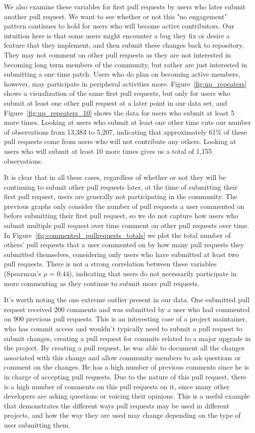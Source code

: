 \documentclass{iitthesis}
\begin{document}
We also examine these variables for first pull requests by users who later
submit another pull request. We want to see whether or not this "no engagement"
pattern continues to hold for users who will become active contributors. Our
intuition here is that some users might encounter a bug they fix or desire a
feature that they implement, and then submit these changes back to repository.
They may not comment on other pull requests as they are not interested in
becoming long term members of the community, but rather are just interested in
submitting a one time patch. Users who do plan on becoming active members,
however, may participate in peripheral activities more.
Figure~\ref{fig:up_repeaters} shows a visualization of the same first pull
requests, but only for users who submit at least one other pull request at a
later point in our data set, and Figure~\ref{fig:up_repeaters_10} shows the data
for users who submit at least 5 more times. Looking at users who submit at least
one other time cuts our number of observations from 13,383 to 5,207, indicating
that approximately 61\% of these pull requests come from users who will not
contribute any others. Looking at users who will submit at least 10 more times
gives us a total of 1,155 observations.

It is clear that in all these cases, regardless of whether or not they will be
continuing to submit other pull requests later, at the time of submitting their
first pull request, users are generally not participating in the community. The
previous graphs only consider the number of pull requests a user commented on
before submitting their first pull request, so we do not capture how users who
submit multiple pull request over time comment on other pull requests over time.
In Figure~\ref{fig:commented_pullrequests_totals} we plot the total number of
others' pull requests that a user commented on by how many pull requests they
submitted themselves, considering only users who have submitted at least two
pull requests. There is not a strong correlation between these variables
(Spearman's $\rho$  = 0.44), indicating that users do not necessarily
participate in more commenting as they continue to submit more pull requests.

It's worth noting the one extreme outlier present in our data. One submitted
pull request received 200 comments and was submitted by a user who had commented
on 900 previous pull requests. This is an interesting case of a project
maintainer, who has commit access and wouldn't typically need to submit a pull
request to submit changes, creating a pull request for commits related to a
major upgrade in the project. By creating a pull request, he was able to
document all the changes associated with this change and allow community members
to ask questions or comment on the changes. He has a high number of previous
comments since he is in charge of accepting pull requests. Due to the nature of
this pull request, there is a high number of comments on this pull requests on
it, since many other developers are asking questions or voicing their opinions.
This is a useful example that demonstrates the different ways pull requests may
be used in different projects, and how the way they are used may change
depending on the type of user submitting them.
\end{document}
